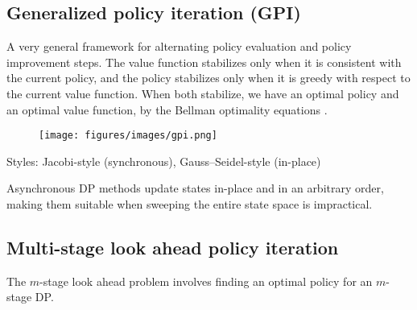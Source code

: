 \subsection{Generalized policy iteration (GPI)}

A very general framework for alternating policy evaluation and policy improvement steps.
The value function stabilizes only when it is consistent with the current policy, and the policy stabilizes only when it is greedy with respect to the current value function.
When both stabilize, we have an optimal policy and an optimal value function, by the Bellman optimality equations .

\vspace*{-0.5em}
\begin{figure}[ht]
    \centering
    \texttt{[image: figures/images/gpi.png]}
\end{figure}
\vspace*{-0.5em}

Styles: Jacobi-style (synchronous), Gauss–Seidel-style (in-place)

Asynchronous DP methods update states in-place and in an arbitrary order, making them suitable when sweeping the entire state space is impractical.

\subsection{Multi-stage look ahead policy iteration}

The \( m \)-stage look ahead problem involves finding an optimal policy for an \( m \)-stage DP.\@
